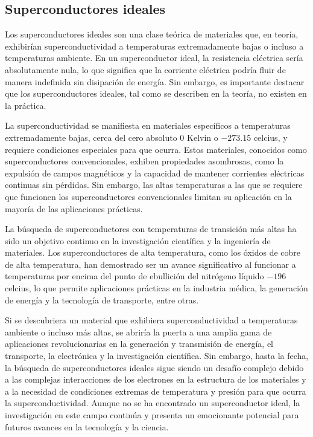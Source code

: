 \documentclass[10.5pt]{article}
\begin{document}
    \subsection{Superconductores ideales}

    Los superconductores ideales son una clase teórica de materiales que, en teoría, exhibirían superconductividad a temperaturas extremadamente bajas o incluso a temperaturas ambiente. En un superconductor ideal, la resistencia eléctrica sería absolutamente nula, lo que significa que la corriente eléctrica podría fluir de manera indefinida sin disipación de energía. Sin embargo, es importante destacar que los superconductores ideales, tal como se describen en la teoría, no existen en la práctica.

    La superconductividad se manifiesta en materiales específicos a temperaturas extremadamente bajas, cerca del cero absoluto $0$ Kelvin o $-273.15$ celcius, y requiere condiciones especiales para que ocurra. Estos materiales, conocidos como superconductores convencionales, exhiben propiedades asombrosas, como la expulsión de campos magnéticos y la capacidad de mantener corrientes eléctricas continuas sin pérdidas. Sin embargo, las altas temperaturas a las que se requiere que funcionen los superconductores convencionales limitan su aplicación en la mayoría de las aplicaciones prácticas.
    
    La búsqueda de superconductores con temperaturas de transición más altas ha sido un objetivo continuo en la investigación científica y la ingeniería de materiales. Los superconductores de alta temperatura, como los óxidos de cobre de alta temperatura, han demostrado ser un avance significativo al funcionar a temperaturas por encima del punto de ebullición del nitrógeno líquido $-196$ celcius, lo que permite aplicaciones prácticas en la industria médica, la generación de energía y la tecnología de transporte, entre otras.
    
    Si se descubriera un material que exhibiera superconductividad a temperaturas ambiente o incluso más altas, se abriría la puerta a una amplia gama de aplicaciones revolucionarias en la generación y transmisión de energía, el transporte, la electrónica y la investigación científica. Sin embargo, hasta la fecha, la búsqueda de superconductores ideales sigue siendo un desafío complejo debido a las complejas interacciones de los electrones en la estructura de los materiales y a la necesidad de condiciones extremas de temperatura y presión para que ocurra la superconductividad. Aunque no se ha encontrado un superconductor ideal, la investigación en este campo continúa y presenta un emocionante potencial para futuros avances en la tecnología y la ciencia.
\end{document}
